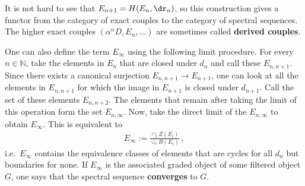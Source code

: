 	It is not hard to see that $E_{n+1}=H(E_n,\dr_n)$, so this construction gives a functor from the category of exact couples to the category of spectral sequences. The higher exact couples $(\alpha^nD,E_n,\ldots)$ are sometimes called \textbf{derived couples}.

	One can also define the term $E_\infty$ using the following limit procedure. For every $n\in\mathbb{N}$, take the elements in $E_n$ that are closed under $d_n$ and call these $E_{n,n+1}$. Since there exists a canonical surjection $E_{n,n+1}\rightarrow E_{n+1}$, one can look at all the elements in $E_{n,n+1}$ for which the image in $E_{n+1}$ is closed under $d_{n+1}$. Call the set of these elements $E_{n,n+2}$. The elements that remain after taking the limit of this operation form the set $E_{n,\infty}$. Now, take the direct limit of the $E_{n,\infty}$ to obtain $E_\infty$. This is equivalent to
	\begin{gather}
		E_\infty := \frac{\cap_iZ(E_i)}{\cup_iB(E_i)}\,,
	\end{gather}
	i.e.~$E_\infty$ contains the equivalence classes of elements that are cycles for all $d_n$ but boundaries for none. If $E_\infty$ is the associated graded object of some filtered object $G$, one says that the spectral sequence \textbf{converges} to $G$.

